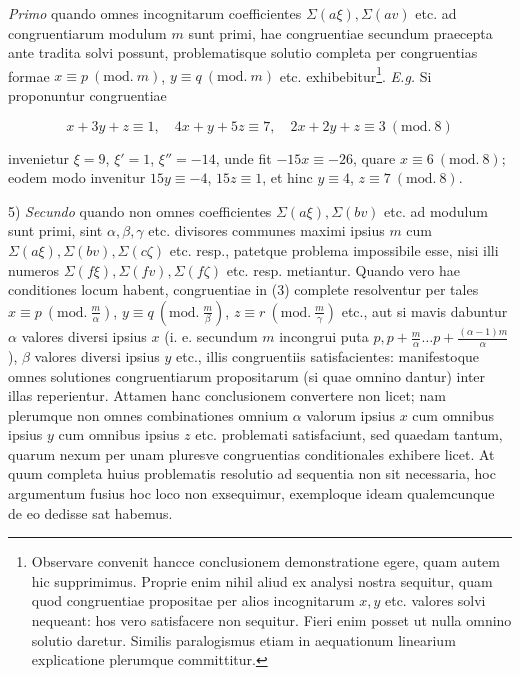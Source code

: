 \emph{Primo} quando omnes incognitarum coefficientes $\Sigma(a\xi),\Sigma(av)$ etc. ad congruentiarum modulum $m$ sunt primi, hae congruentiae secundum praecepta ante tradita solvi possunt, problematisque solutio completa per congruentias formae $x\equiv p\ (\mathrm{mod.}\ m)$, $y\equiv q\ (\mathrm{mod.}\ m)$ etc. exhibebitur\begingroup\renewcommand{\thefootnote}{*)}\footnote{Observare convenit hancce conclusionem demonstratione egere, quam autem hic supprimimus. Proprie enim nihil aliud ex analysi nostra sequitur, quam quod congruentiae propositae per alios incognitarum $x,y$ etc. valores solvi nequeant: hos vero satisfacere non sequitur. Fieri enim posset ut nulla omnino solutio daretur. Similis paralogismus etiam in aequationum linearium explicatione plerumque committitur.}\endgroup. \emph{E.g.} Si proponuntur congruentiae

\[x+3y+z\equiv1,\quad4x+y+5z\equiv7,\quad2x+2y+z\equiv3\ (\mathrm{mod.}\ 8)\]

 invenietur $\xi=9$, $\xi'=1$, $\xi''=-14$, unde fit $-15x\equiv-26$, quare $x\equiv6\ (\mathrm{mod.}\ 8)$; eodem modo invenitur $15y\equiv-4$, $15z\equiv1$, et hinc $y\equiv4$, $z\equiv7\ (\mathrm{mod.}\ 8)$.

5) \emph{Secundo} quando non omnes coefficientes $\Sigma(a\xi),\Sigma(bv)$ etc. ad modulum sunt primi, sint $\alpha,\beta,\gamma$ etc. divisores communes maximi ipsius $m$ cum $\Sigma(a\xi),\Sigma(bv),\Sigma(c\zeta)$ etc. resp., patetque problema impossibile esse, nisi illi numeros $\Sigma(f\xi),\Sigma(fv),\Sigma(f\zeta)$ etc. resp. metiantur. Quando vero hae conditiones locum habent, congruentiae in (3) complete resolventur per tales $x\equiv p\ (\mathrm{mod.}\ \frac{m}{\alpha})$, $y\equiv q\ (\mathrm{mod.}\ \frac{m}{\beta})$, $z\equiv r\ (\mathrm{mod.}\ \frac{m}{\gamma})$ etc., aut si mavis dabuntur $\alpha$ valores diversi ipsius $x$ (i. e. secundum $m$ incongrui puta $p,p+\frac{m}{\alpha}\ldots p+\frac{(\alpha-1)m}{\alpha}$),
$\beta$ valores diversi ipsius $y$ etc., illis congruentiis satisfacientes: manifestoque omnes solutiones congruentiarum propositarum (si quae omnino dantur) inter illas reperientur. Attamen hanc conclusionem convertere non licet; nam plerumque non omnes combinationes omnium $\alpha$ valorum ipsius $x$ cum omnibus ipsius $y$ cum omnibus ipsius $z$ etc. problemati satisfaciunt, sed quaedam tantum, quarum nexum per unam pluresve congruentias conditionales exhibere licet. At quum completa huius problematis resolutio ad sequentia non sit necessaria, hoc argumentum fusius hoc loco non exsequimur, exemploque ideam qualemcunque de eo dedisse sat habemus.

